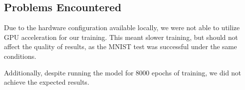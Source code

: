 \documentclass[12pt,letterpaper]{article}
\begin{document}
	\subsection{Problems Encountered}
	Due to the hardware configuration available locally, we were not able to utilize GPU acceleration for our training. This meant slower training, but should not affect the quality of results, as the MNIST test was successful under the same conditions.

	Additionally, despite running the model for 8000 epochs of training, we did not achieve the expected results.


\nocite{*}
\end{document}
